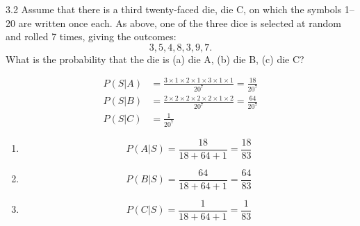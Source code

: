 \documentclass[12pt, a4paper]{article}
\begin{document}
\begin{prob}{3.2}
    Assume that there is a third twenty-faced die, die C, on which the symbols 1--20 are written once each. As above, one of the three dice is selected at random and rolled 7 times, giving the outcomes:
\[ 3, 5, 4, 8, 3, 9, 7. \]
What is the probability that the die is (a) die A, (b) die B, (c) die C?
\end{prob}
\begin{sol}
    \begin{align*}
        P(S|A) &= \frac{3 \times 1 \times 2 \times 1 \times 3 \times 1 \times 1}{20^7} = \frac{18}{20^7} \\
        P(S|B) &= \frac{2 \times 2 \times 2 \times 2 \times 2 \times 1 \times 2}{20^7} = \frac{64}{20^7} \\
        P(S|C) &= \frac{1}{20^7}
    \end{align*}
    \begin{enumerate}
        \item[(i)] $$P(A|S) = \frac{18}{18+64+1} = \frac{18}{83}$$ 
        \item[(ii)]$$P(B|S) = \frac{64}{18+64+1} = \frac{64}{83}$$ 
        \item[(iii)]  $$P(C|S) = \frac{1}{18+64+1} = \frac{1}{83}$$ 
    \end{enumerate}
\end{sol}
\bigskip
\end{document}
